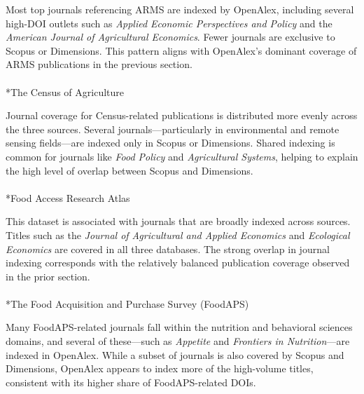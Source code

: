 \documentclass[
  letterpaper,
  DIV=11,
  numbers=noendperiod]{scrartcl}
\makeatletter
\let\oldparagraph\paragraph
\renewcommand{\paragraph}{
    \@ifstar
      \xxxParagraphStar
      \xxxParagraphNoStar
  }
\newcommand{\xxxParagraphStar}[1]{\oldparagraph*{#1}\mbox{}}
\newcommand{\xxxParagraphNoStar}[1]{\oldparagraph{#1}\mbox{}}
\makeatother
\begin{document}
Most top journals referencing ARMS are indexed by OpenAlex, including
several high-DOI outlets such as \emph{Applied Economic Perspectives and
Policy} and the \emph{American Journal of Agricultural Economics}. Fewer
journals are exclusive to Scopus or Dimensions. This pattern aligns with
OpenAlex's dominant coverage of ARMS publications in the previous
section.

\paragraph*{The Census of
Agriculture}\label{the-census-of-agriculture-1}

Journal coverage for Census-related publications is distributed more
evenly across the three sources. Several journals---particularly in
environmental and remote sensing fields---are indexed only in Scopus or
Dimensions. Shared indexing is common for journals like \emph{Food
Policy} and \emph{Agricultural Systems}, helping to explain the high
level of overlap between Scopus and Dimensions.

\paragraph*{Food Access Research
Atlas}\label{food-access-research-atlas-1}

This dataset is associated with journals that are broadly indexed across
sources. Titles such as the \emph{Journal of Agricultural and Applied
Economics} and \emph{Ecological Economics} are covered in all three
databases. The strong overlap in journal indexing corresponds with the
relatively balanced publication coverage observed in the prior section.

\paragraph*{The Food Acquisition and Purchase Survey
(FoodAPS)}\label{the-food-acquisition-and-purchase-survey-foodaps-1}

Many FoodAPS-related journals fall within the nutrition and behavioral
sciences domains, and several of these---such as \emph{Appetite} and
\emph{Frontiers in Nutrition}---are indexed in OpenAlex. While a subset
of journals is also covered by Scopus and Dimensions, OpenAlex appears
to index more of the high-volume titles, consistent with its higher
share of FoodAPS-related DOIs.
\end{document}

